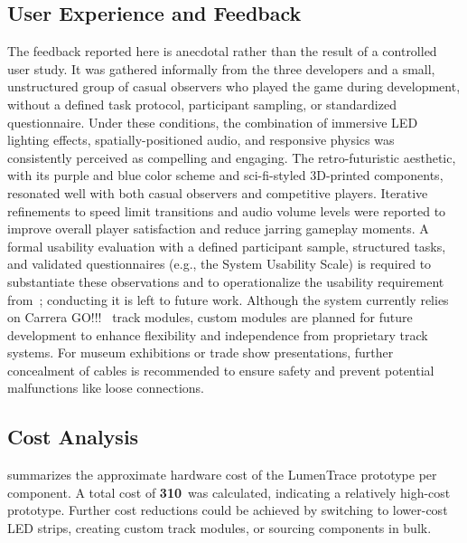 \documentclass[10pt,journal,final,a4paper]{IEEEtran}
\begin{document}
\subsection{User Experience and Feedback}
\label{subsec:user-experience-and-feedback}

The feedback reported here is anecdotal rather than the result of a controlled user study. It was gathered informally from the three developers and a small, unstructured group of casual observers who played the game during development, without a defined task protocol, participant sampling, or standardized questionnaire. Under these conditions, the combination of immersive LED lighting effects, spatially-positioned audio, and responsive physics was consistently perceived as compelling and engaging. The retro-futuristic aesthetic, with its purple and blue color scheme and sci-fi-styled 3D-printed components, resonated well with both casual observers and competitive players. Iterative refinements to speed limit transitions and audio volume levels were reported to improve overall player satisfaction and reduce jarring gameplay moments. A formal usability evaluation with a defined participant sample, structured tasks, and validated questionnaires (e.g., the System Usability Scale) is required to substantiate these observations and to operationalize the usability requirement from~; conducting it is left to future work. Although the system currently relies on Carrera GO!!!~\cite{carrera:2026carrera} track modules, custom modules are planned for future development to enhance flexibility and independence from proprietary track systems. For museum exhibitions or trade show presentations, further concealment of cables is recommended to ensure safety and prevent potential malfunctions like loose connections.

\subsection{Cost Analysis}
\label{subsec:cost-analysis}

 summarizes the approximate hardware cost of the LumenTrace prototype per component. A total cost of \textbf{310\,\texteuro} was calculated, indicating a relatively high-cost prototype. Further cost reductions could be achieved by switching to lower-cost LED strips, creating custom track modules, or sourcing components in bulk.   
\end{document}

